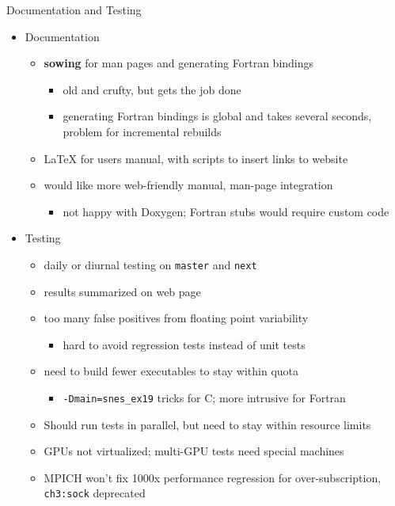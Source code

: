 \documentclass{beamer}
\begin{document}
\begin{frame}{Documentation and Testing}
  \begin{itemize}
  \item Documentation
    \begin{itemize}
    \item {\bf sowing} for man pages and generating Fortran bindings
      \begin{itemize}
      \item old and crufty, but gets the job done
      \item generating Fortran bindings is global and takes several
        seconds, problem for incremental rebuilds
      \end{itemize}
    \item \LaTeX{} for users manual, with scripts to insert links to website
    \item would like more web-friendly manual, man-page integration
      \begin{itemize}
      \item not happy with Doxygen; Fortran stubs would require custom code
      \end{itemize}
    \end{itemize}
  \item Testing
    \begin{itemize}
    \item daily or diurnal testing on \texttt{master} and \texttt{next}
    \item results summarized on web page
    \item too many false positives from floating point variability
      \begin{itemize}
      \item hard to avoid regression tests instead of unit tests
      \end{itemize}
    \item need to build fewer executables to stay within quota
      \begin{itemize}
      \item \texttt{-Dmain=snes\_ex19} tricks for C; more intrusive for Fortran
      \end{itemize}
    \item Should run tests in parallel, but need to stay within resource limits
    \item GPUs not virtualized; multi-GPU tests need special machines
    \item MPICH won't fix 1000x performance regression for over-subscription, \texttt{ch3:sock} deprecated
    \end{itemize}
  \end{itemize}
\end{frame}
\end{document}
